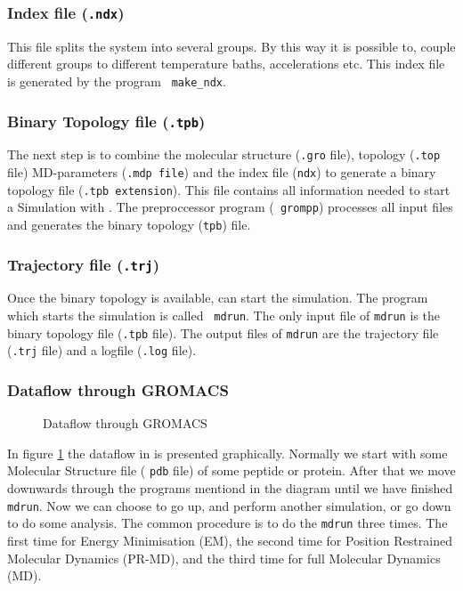 \subsubsection{Index file ({\tt .ndx})}
This file splits the system into several groups. By this way it is
possible to, couple different groups to different temperature baths,
accelerations etc. This index file is generated by the program {\tt
make\_ndx}.  

\subsubsection{Binary Topology file ({\tt .tpb})}
The next step is to combine the molecular structure ({\tt .gro} file),
topology ({\tt .top} file) MD-parameters ({\tt .mdp file}) and the
index file ({\tt ndx}) to generate a binary topology file ({\tt .tpb
extension}). This file contains all information needed to start a
Simulation with {\gromacs}. The {\gromacs} preproccessor program ({\tt
grompp}) processes all input files and generates the binary topology
({\tt tpb}) file.   

\subsubsection{Trajectory file ({\tt .trj})}
Once the binary topology is available, {\gromacs} can start the
simulation. The program which starts the simulation is called {\tt
mdrun}. The only input file of {\tt mdrun} is the binary topology file
({\tt .tpb} file). The output files of {\tt mdrun} are the trajectory
file ({\tt .trj} file) and a logfile ({\tt .log} file).

\subsubsection{Dataflow through GROMACS }
\begin {figure}[H]
\centerline{}
\caption {Dataflow through GROMACS} 
\label{fig:grom_dflow}
\end {figure}
In figure \ref{fig:grom_dflow} the dataflow in {\gromacs} is presented
graphically. Normally we start with some Molecular Structure file (
{\tt pdb} file) of some peptide or protein. After that we move
downwards through the programs mentiond in the diagram until we have
finished {\tt mdrun}. Now we can choose to go up, and perform another
simulation, or go down to do some analysis.
The common procedure is to do the {\tt mdrun} three times. The first
time for Energy Minimisation (EM), the second time for Position
Restrained Molecular Dynamics (PR-MD), and the third time for full
Molecular Dynamics (MD). 


